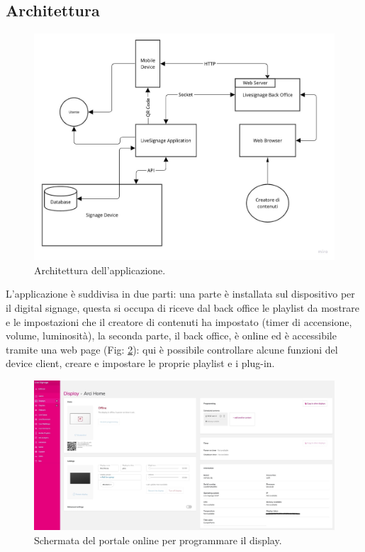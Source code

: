 \subsection{Architettura}
\begin{figure}[H]
    \centering
    \includegraphics[width= 1.1\textwidth]{images/Introduzione/Architettura.jpg} 
    \caption{Architettura dell'applicazione.} 
    \label{fig:architettura}
\end{figure}

L'applicazione è suddivisa in due parti: una parte è installata sul dispositivo per il digital signage, questa si occupa di riceve dal back office le playlist da mostrare e le impostazioni che il creatore di contenuti ha impostato (timer di accensione, volume, luminosità), la seconda parte, il back office, è online ed è accessibile tramite una web page (Fig: \ref*{fig:schermata-web}): qui è possibile controllare alcune funzioni del device client, creare e impostare le proprie playlist e i plug-in. 

\begin{figure}[H]
    \centering
    \includegraphics[width= 1.1\textwidth]{images/Introduzione/SchermataWebLS.jpg} 
    \caption{Schermata del portale online per programmare il display.} 
    \label{fig:schermata-web}
\end{figure}

